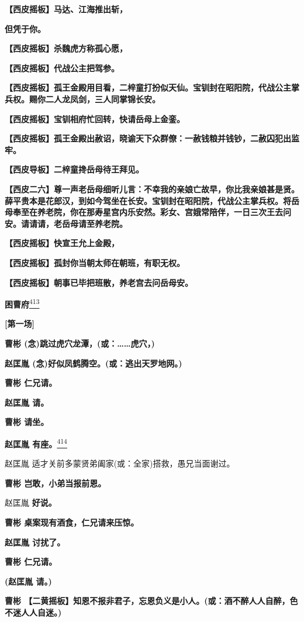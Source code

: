 \textbf{【西皮摇板】马达、江海推出斩，}

\textbf{但凭于你。}

\textbf{【西皮摇板】杀魏虎方称孤心愿，}

\textbf{【西皮摇板】代战公主把驾参。}

\textbf{【西皮摇板】孤王金殿用目看，二梓童打扮似天仙。宝钏封在昭阳院，代战公主掌兵权。赐你二人龙凤剑，三人同掌锦长安。}

\textbf{【西皮摇板】宝钏相府忙回转，快请岳母上金銮。}

\textbf{【西皮摇板】孤王金殿出赦诏，晓谕天下众群僚：一赦钱粮并钱钞，二赦囚犯出监牢。}

\textbf{【西皮导板】二梓童搀岳母待王拜见。}

\textbf{【西皮二六】尊一声老岳母细听儿言：不幸我的亲娘亡故早，你比我亲娘甚是贤。薛平贵本是花郎汉，到如今驾坐在长安。宝钏封在昭阳院，代战公主掌兵权。将岳母奉至在养老院，你在那寿星宫内乐安然。彩女、宫娥常陪伴，一日三次王去问安。请请请，老岳母请至养老院。}

\textbf{【西皮摇板】快宣王允上金殿，}

\textbf{【西皮摇板】孤封你当朝太师在朝班，有职无权。}

\textbf{【西皮摇板】朝事已毕把班散，养老宫去问岳母安。}

\textbf{困曹府}\protect\hyperlink{fn413}{\textsuperscript{413}}

\textbf{{[}第一场{]}}

\textbf{曹彬 (念)跳过虎穴龙潭，(或：\ldots{}\ldots{}虎穴，)}

\textbf{赵匡胤 (念)好似凤鹤腾空。(或：逃出天罗地网。)}

\textbf{曹彬 仁兄请。}

\textbf{赵匡胤 请。}

\textbf{曹彬 请坐。}

\textbf{赵匡胤 有座。}\protect\hyperlink{fn414}{\textsuperscript{414}}

赵匡胤 适才关前多蒙贤弟阖家(或：全家)搭救，愚兄当面谢过。

\textbf{曹彬 岂敢，小弟当报前恩。}

赵匡胤 \textbf{好说。}

\textbf{曹彬 桌案现有酒食，仁兄请来压惊。}

\textbf{赵匡胤 讨扰了。}

\textbf{曹彬 仁兄请。}

\textbf{(赵匡胤 请。)}

\textbf{曹彬
【二黄摇板】知恩不报非君子，忘恩负义是小人。(或：酒不醉人人自醉，色不迷人人自迷。)}

